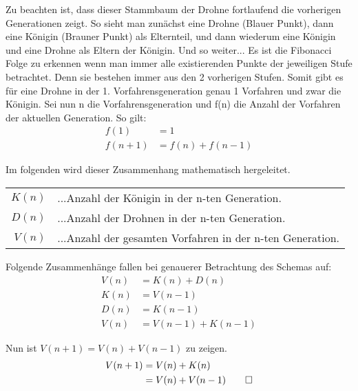 \documentclass[titlepage]{article}
\begin{document}
	Zu beachten ist, dass dieser Stammbaum der Drohne fortlaufend die vorherigen Generationen zeigt. So sieht man zunächst eine Drohne (Blauer Punkt), dann eine Königin (Brauner Punkt) als Elternteil, und dann wiederum eine Königin und eine Drohne als Eltern der Königin. Und so weiter... Es ist die Fibonacci Folge zu erkennen wenn man immer alle existierenden Punkte der jeweiligen Stufe betrachtet. Denn sie bestehen immer aus den 2 vorherigen Stufen. Somit gibt es für eine Drohne in der 1. Vorfahrensgeneration genau 1 Vorfahren und zwar die Königin. Sei nun n die Vorfahrensgeneration und f(n) die Anzahl der Vorfahren der aktuellen Generation. So gilt:
	\begin{align*}
		f(1)&=1\\
		f(n+1)&=f(n)+f(n-1)
	\end{align*}

	\newpage
	\noindent
	Im folgenden wird dieser Zusammenhang mathematisch hergeleitet.
	
	\begin{table}[h]
		\begin{tabular}{rl}
			$K(n)$&...Anzahl der Königin in der n-ten Generation.\\
			$D(n)$&...Anzahl der Drohnen in der n-ten Generation.\\
			$V(n)$&...Anzahl der gesamten Vorfahren in der n-ten Generation.\\
		\end{tabular}
	\end{table}

	\noindent
	Folgende Zusammenhänge fallen bei genauerer Betrachtung des Schemas auf:
	\begin{align*}
		V(n)&=K(n)+D(n)\\
		K(n)&=V(n-1)\\
		D(n)&=K(n-1)\\
		V(n)&=V(n-1)+K(n-1)
	\end{align*}
	
	\noindent
	Nun ist $V(n+1)=V(n)+V(n-1)$ zu zeigen.
	\begin{align*}
			V(n+1)&=V(n)+K(n)\\
			&=V(n)+V(n-1)\qed
	\end{align*}
\end{document}
